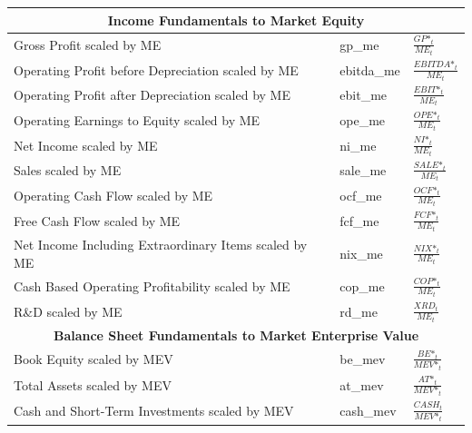 \documentclass[12pt,title,fleqn]{article}
\begin{document}
{\begin{longtable}{@{\extracolsep{\fill}}|p{6cm}|l|p{8cm}|@{}}
    \hline 
	\multicolumn{3}{|c|}{\textbf{Income Fundamentals to Market Equity}} \\
	\hline  	
    
    Gross Profit scaled by ME & gp\_me &$\frac{GP\mbox{*}_t}{ME_t}$ \\
	
	Operating Profit before Depreciation scaled by ME & ebitda\_me &$\frac{EBITDA\mbox{*}_t}{ME_t}$\\
	
	Operating Profit after Depreciation scaled by ME & ebit\_me &$\frac{EBIT\mbox{*}_t}{ME_t}$\\
	
	Operating Earnings to Equity scaled by ME & ope\_me &$\frac{OPE\mbox{*}_t}{ME_t}$\\
	
	Net Income scaled by ME & ni\_me &$\frac{NI\mbox{*}_t}{ME_t}$ \\
	
	Sales scaled by ME & sale\_me &$\frac{SALE\mbox{*}_t}{ME_t}$\\
	
	Operating Cash Flow scaled by ME & ocf\_me &$\frac{OCF\mbox{*}_t}{ME_t}$\\
	
	Free Cash Flow scaled by ME & fcf\_me &$\frac{FCF\mbox{*}_t}{ME_t}$ \\
	
	Net Income Including Extraordinary Items scaled by ME & nix\_me &$\frac{NIX\mbox{*}_t}{ME_t}$\\
	
	Cash Based Operating Profitability scaled by ME & cop\_me &$\frac{COP\mbox{*}_t}{ME_t}$\\
	
	R\&D scaled by ME & rd\_me &$ \frac{XRD_t}{ME_t}$\\
	
    \hline 
	\multicolumn{3}{|c|}{\textbf{Balance Sheet Fundamentals to Market Enterprise Value}} \\
	\hline 	
	
	Book Equity scaled by MEV & be\_mev &$\frac{BE\mbox{*}_t}{MEV\mbox{*}_t}$ \\

    Total Assets scaled by MEV & at\_mev &$\frac{AT\mbox{*}_t}{MEV\mbox{*}_t}$ \\
	
    Cash and Short-Term Investments scaled by MEV & cash\_mev &$\frac{CASH_t}{MEV\mbox{*}_t}$ \\
	

\end{longtable}}
\end{document}
